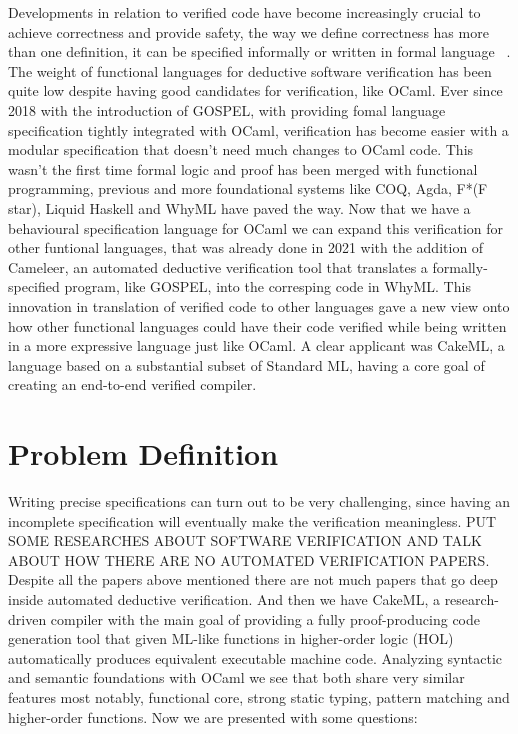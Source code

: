 Developments in relation to verified code have become increasingly crucial to achieve correctness and provide safety, 
the way we define correctness has more than one definition, it can be specified informally or written in formal language 
~\cite{Filliatre11}. The weight of functional languages for deductive software verification has been quite low despite having
good candidates for verification, like OCaml. Ever since 2018 with the introduction of GOSPEL, with providing
fomal language specification tightly integrated with OCaml, verification has become easier with a modular specification
that doesn't need much changes to OCaml code. This wasn't the first time formal logic and proof has been merged with 
functional programming, previous and more foundational systems like COQ, Agda, F*(F star), Liquid Haskell and WhyML have
paved the way. Now that we have a behavioural specification language for OCaml we can expand this verification for other
funtional languages, that was already done in 2021 with the addition of Cameleer, an automated deductive verification
tool that translates a formally-specified program, like GOSPEL, into the corresping code in WhyML. This innovation in
translation of verified code to other languages gave a new view onto how other functional languages could have their
code verified while being written in a more expressive language just like OCaml. A clear applicant was CakeML, a
language based on a substantial subset of Standard ML, having a core goal of creating an end-to-end verified compiler.




\section{Problem Definition}
\label{sec:Problem_Definition}


Writing precise specifications can turn out to be very challenging, since having an incomplete specification will eventually
make the verification meaningless. PUT SOME RESEARCHES ABOUT SOFTWARE VERIFICATION AND TALK ABOUT HOW THERE ARE NO AUTOMATED VERIFICATION PAPERS.
Despite all the papers above mentioned there are not much papers that go deep inside automated deductive verification.
And then we have CakeML, a research-driven compiler with the main goal of providing a fully proof-producing code generation tool 
that given ML-like functions in higher-order logic (HOL) automatically produces equivalent executable machine code. Analyzing
syntactic and semantic foundations with OCaml we see that both share very similar features most notably, functional core, 
strong static typing, pattern matching and higher-order functions.
Now we are presented with some questions:

